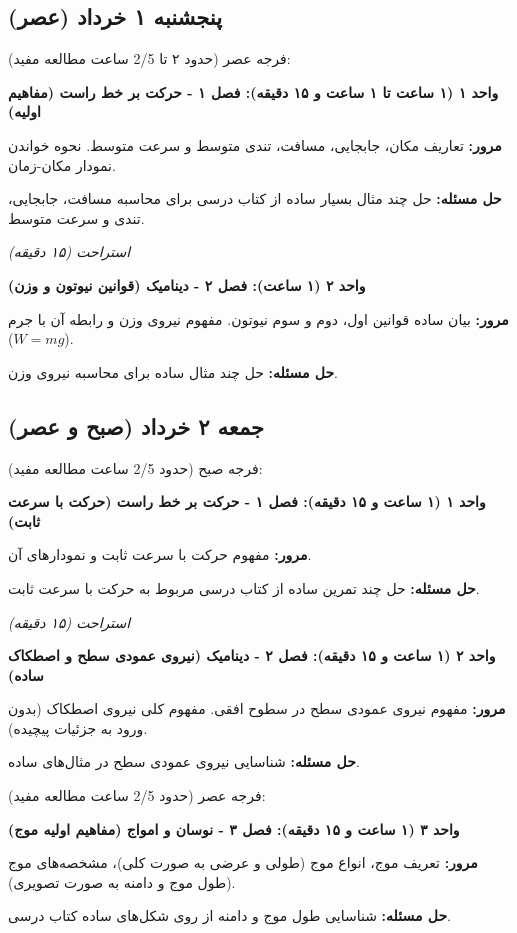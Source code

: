 \documentclass[12pt]{article}
\newcommand{\unithead}[1]{\par\vspace{1ex}\noindent\textbf{#1}\par\nopagebreak[4]\vspace{0.5ex}}
\newcommand{\休息}[1]{\par\centering\textit{#1}\par\vspace{1ex}} %
\begin{document}
\subsection*{پنجشنبه ۱ خرداد (عصر)}
فرجه عصر (حدود ۲ تا 2/5 ساعت مطالعه مفید):

\unithead{واحد ۱ (۱ ساعت تا ۱ ساعت و ۱۵ دقیقه): فصل ۱ - حرکت بر خط راست (مفاهیم اولیه)}
\noindent\textbf{مرور: }تعاریف مکان، جابجایی، مسافت، تندی متوسط و سرعت متوسط. نحوه خواندن نمودار مکان-زمان.
\par\noindent\textbf{حل مسئله: }حل چند مثال بسیار ساده از کتاب درسی برای محاسبه مسافت، جابجایی، تندی و سرعت متوسط.

\休息{استراحت (۱۵ دقیقه)}

\unithead{واحد ۲ (۱ ساعت): فصل ۲ - دینامیک (قوانین نیوتون و وزن)}
\noindent\textbf{مرور: }بیان ساده قوانین اول، دوم و سوم نیوتون. مفهوم نیروی وزن و رابطه آن با جرم ($W=mg$).
\par\noindent\textbf{حل مسئله: }حل چند مثال ساده برای محاسبه نیروی وزن.

\subsection*{جمعه ۲ خرداد (صبح و عصر)}
فرجه صبح (حدود 2/5 ساعت مطالعه مفید):

\unithead{واحد ۱ (۱ ساعت و ۱۵ دقیقه): فصل ۱ - حرکت بر خط راست (حرکت با سرعت ثابت)}
\noindent\textbf{مرور: }مفهوم حرکت با سرعت ثابت و نمودارهای آن.
\par\noindent\textbf{حل مسئله: }حل چند تمرین ساده از کتاب درسی مربوط به حرکت با سرعت ثابت.

\休息{استراحت (۱۵ دقیقه)}

\unithead{واحد ۲ (۱ ساعت و ۱۵ دقیقه): فصل ۲ - دینامیک (نیروی عمودی سطح و اصطکاک ساده)}
\noindent\textbf{مرور: }مفهوم نیروی عمودی سطح در سطوح افقی. مفهوم کلی نیروی اصطکاک (بدون ورود به جزئیات پیچیده).
\par\noindent\textbf{حل مسئله: }شناسایی نیروی عمودی سطح در مثال‌های ساده.

\vspace{1em}
فرجه عصر (حدود 2/5 ساعت مطالعه مفید):

\unithead{واحد ۳ (۱ ساعت و ۱۵ دقیقه): فصل ۳ - نوسان و امواج (مفاهیم اولیه موج)}
\noindent\textbf{مرور: }تعریف موج، انواع موج (طولی و عرضی به صورت کلی)، مشخصه‌های موج (طول موج و دامنه به صورت تصویری).
\par\noindent\textbf{حل مسئله: }شناسایی طول موج و دامنه از روی شکل‌های ساده کتاب درسی.
\end{document}
